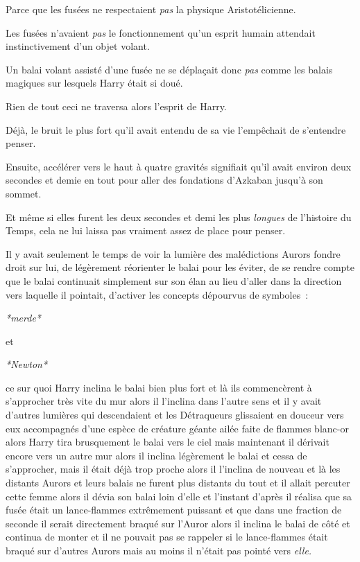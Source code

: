 Parce que les fusées ne respectaient \emph{pas} la physique Aristotélicienne.

Les fusées n'avaient \emph{pas} le fonctionnement qu'un esprit humain attendait instinctivement d'un objet volant.

Un balai volant assisté d'une fusée ne se déplaçait donc \emph{pas} comme les balais magiques sur lesquels Harry était si doué.

Rien de tout ceci ne traversa alors l'esprit de Harry.

Déjà, le bruit le plus fort qu'il avait entendu de sa vie l'empêchait de s'entendre penser.

Ensuite, accélérer vers le haut à quatre gravités signifiait qu'il avait environ deux secondes et demie en tout pour aller des fondations d'Azkaban jusqu'à son sommet.

Et même si elles furent les deux secondes et demi les plus \emph{longues} de l'histoire du Temps, cela ne lui laissa pas vraiment assez de place pour penser.

Il y avait seulement le temps de voir la lumière des malédictions Aurors fondre droit sur lui, de légèrement réorienter le balai pour les éviter, de se rendre compte que le balai continuait simplement sur son élan au lieu d'aller dans la direction vers laquelle il pointait, d'activer les concepts dépourvus de symboles~:

\emph{*merde*}

et

\emph{*Newton*}

ce sur quoi Harry inclina le balai bien plus fort et là ils commencèrent à s'approcher très vite du mur alors il l'inclina dans l'autre sens et il y avait d'autres lumières qui descendaient et les Détraqueurs glissaient en douceur vers eux accompagnés d'une espèce de créature géante ailée faite de flammes blanc-or alors Harry tira brusquement le balai vers le ciel mais maintenant il dérivait encore vers un autre mur alors il inclina légèrement le balai et cessa de s'approcher, mais il était déjà trop proche alors il l'inclina de nouveau et là les distants Aurors et leurs balais ne furent plus distants du tout et il allait percuter cette femme alors il dévia son balai loin d'elle et l'instant d'après il réalisa que sa fusée était un lance-flammes extrêmement puissant et que dans une fraction de seconde il serait directement braqué sur l'Auror alors il inclina le balai de côté et continua de monter et il ne pouvait pas se rappeler si le lance-flammes était braqué sur d'autres Aurors mais au moins il n'était pas pointé vers \emph{elle.}

